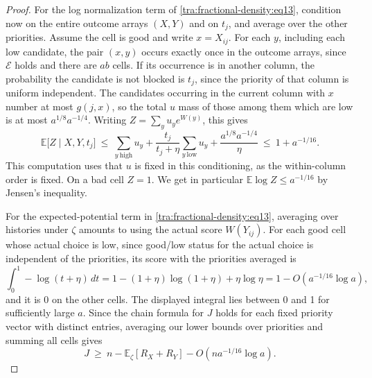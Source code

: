\begin{proof}
For the log normalization term of \eqref{tra:fractional-density:eq13}, condition now on the entire outcome arrays \((X,Y)\) and on \(t_j\), and average over the other priorities. Assume the cell is good and write \(x=X_{ij}\). For each \(y\), including each low candidate, the pair \((x,y)\) occurs exactly once in the outcome arrays, since \(\mathcal E\) holds and there are \(ab\) cells. If its occurrence is in another column, the probability the candidate is not blocked is \(t_j\), since the priority of that column is uniform independent. The candidates occurring in the current column with \(x\) number at most \(g(j,x)\), so the total \(u\) mass of those among them which are low is at most \(a^{1/8} a^{-1/4}\). Writing \(Z=\sum_y u_y e^{W(y)}\), this gives
\[
 \mathbb E\big[ Z\mid X,Y,t_j\big]
 \ \le\ \sum_{y\ \mathrm{high}} u_y
       +\frac{t_j}{t_j+\eta}\sum_{y\ \mathrm{low}} u_y
       +\frac{a^{1/8}a^{-1/4}}{\eta}
 \ \le\ 1+a^{-1/16}.
\]
This computation uses that \(u\) is fixed in this conditioning, as the within-column order is fixed. On a bad cell \(Z=1\). We get in particular \(\mathbb E\log Z\le a^{-1/16}\) by Jensen's inequality.

For the expected-potential term in \eqref{tra:fractional-density:eq13}, averaging over histories under \(\zeta\) amounts to using the actual score \(W(Y_{ij})\). For each good cell whose actual choice is low, since good/low status for the actual choice is independent of the priorities, its score with the priorities averaged is
\[
 \int_0^1 -\log(t+\eta)\,dt
 =1-(1+\eta)\log(1+\eta)+\eta\log\eta
 =1-O(a^{-1/16}\log a),
\]
and it is 0 on the other cells. The displayed integral lies between 0 and 1 for sufficiently large \(a\). Since the chain formula for \(J\) holds for each fixed priority vector with distinct entries, averaging our lower bounds over priorities and summing all cells gives
\begin{equation}
 J\ \ge\ n-\mathbb E_\zeta[R_X+R_Y]-O(n a^{-1/16}\log a).
 \label{tra:fractional-density:eq16}
\end{equation}


\end{proof}
